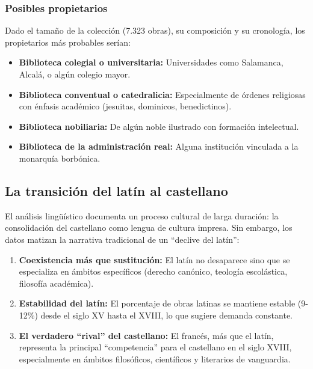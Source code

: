 \documentclass[12pt,a4paper]{article}
\begin{document}
\subsubsection{Posibles propietarios}

Dado el tamaño de la colección (7.323 obras), su composición y su cronología, los propietarios más probables serían:

\begin{itemize}
    \item \textbf{Biblioteca colegial o universitaria:} Universidades como Salamanca, Alcalá, o algún colegio mayor.

    \item \textbf{Biblioteca conventual o catedralicia:} Especialmente de órdenes religiosas con énfasis académico (jesuitas, dominicos, benedictinos).

    \item \textbf{Biblioteca nobiliaria:} De algún noble ilustrado con formación intelectual.

    \item \textbf{Biblioteca de la administración real:} Alguna institución vinculada a la monarquía borbónica.
\end{itemize}

\subsection{La transición del latín al castellano}

El análisis lingüístico documenta un proceso cultural de larga duración: la consolidación del castellano como lengua de cultura impresa. Sin embargo, los datos matizan la narrativa tradicional de un ``declive del latín'':

\begin{enumerate}
    \item \textbf{Coexistencia más que sustitución:} El latín no desaparece sino que se especializa en ámbitos específicos (derecho canónico, teología escolástica, filosofía académica).

    \item \textbf{Estabilidad del latín:} El porcentaje de obras latinas se mantiene estable (9-12\%) desde el siglo XV hasta el XVIII, lo que sugiere demanda constante.

    \item \textbf{El verdadero ``rival'' del castellano:} El francés, más que el latín, representa la principal ``competencia'' para el castellano en el siglo XVIII, especialmente en ámbitos filosóficos, científicos y literarios de vanguardia.
\end{enumerate}
\end{document}

